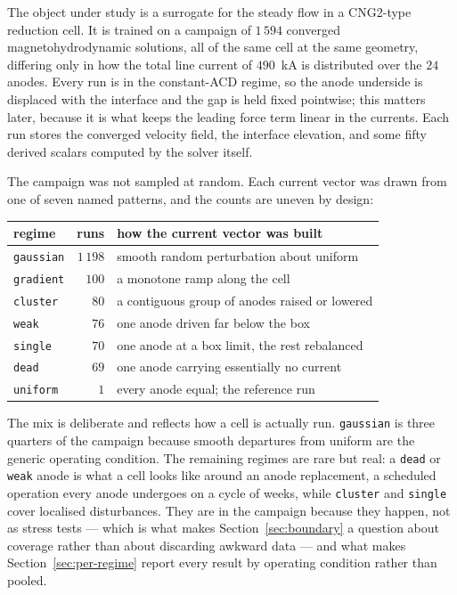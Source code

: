 \documentclass[11pt,a4paper]{article}
\theoremstyle{plain}
\theoremstyle{definition}
\theoremstyle{remark}
\begin{document}
The object under study is a surrogate for the steady flow in a CNG2-type
reduction cell. It is trained on a campaign of $1\,594$ converged
magnetohydrodynamic solutions, all of the same cell at the same geometry,
differing only in how the total line current of $490$~kA is distributed over the
$24$ anodes. Every run is in the constant-ACD regime, so the anode underside is
displaced with the interface and the gap is held fixed pointwise; this matters
later, because it is what keeps the leading force term linear in the currents.
Each run stores the converged velocity field, the interface elevation, and some
fifty derived scalars computed by the solver itself.

The campaign was not sampled at random. Each current vector was drawn from one
of seven named patterns, and the counts are uneven by design:

\begin{center}
\small
\begin{tabular}{@{}lrl@{}}
\toprule
regime & runs & how the current vector was built \\
\midrule
\texttt{gaussian} & $1\,198$ & smooth random perturbation about uniform \\
\texttt{gradient} & $100$    & a monotone ramp along the cell \\
\texttt{cluster}  & $80$     & a contiguous group of anodes raised or lowered \\
\texttt{weak}     & $76$     & one anode driven far below the box \\
\texttt{single}   & $70$     & one anode at a box limit, the rest rebalanced \\
\texttt{dead}     & $69$     & one anode carrying essentially no current \\
\texttt{uniform}  & $1$      & every anode equal; the reference run \\
\bottomrule
\end{tabular}
\end{center}

\noindent
The mix is deliberate and reflects how a cell is actually run.
\texttt{gaussian} is three quarters of the campaign because smooth departures
from uniform are the generic operating condition. The remaining regimes are rare
but real: a \texttt{dead} or \texttt{weak} anode is what a cell looks like around
an anode replacement, a scheduled operation every anode undergoes on a cycle of
weeks, while \texttt{cluster} and \texttt{single} cover localised disturbances.
They are in the campaign because they happen, not as stress tests --- which is
what makes Section~\ref{sec:boundary} a question about coverage rather than
about discarding awkward data --- and what makes
Section~\ref{sec:per-regime} report every result by operating condition rather
than pooled.
\end{document}
